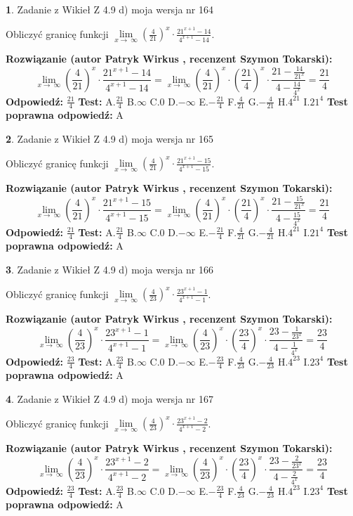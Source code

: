 \documentclass[12pt, a4paper]{article}
\theoremstyle{definition} %
\newtheorem{zad}{}
\newcommand{\zadStart}[1]{\begin{zad}#1\newline}
\newcommand{\zadStop}{\end{zad}}
\newcommand{\rozwStart}[2]{\noindent \textbf{Rozwiązanie (autor #1 , recenzent #2): }\newline}
\newcommand{\rozwStop}{\newline}
\newcommand{\odpStart}{\noindent \textbf{Odpowiedź:}\newline}
\newcommand{\odpStop}{\newline}
\newcommand{\testStart}{\noindent \textbf{Test:}\newline}
\newcommand{\testStop}{\newline}
\newcommand{\kluczStart}{\noindent \textbf{Test poprawna odpowiedź:}\newline}
\newcommand{\kluczStop}{\newline}
\begin{document}
\zadStart{Zadanie z Wikieł Z 4.9 d) moja wersja nr 164}


Obliczyć granicę funkcji  $\lim\limits_{x\to\ \infty}(\frac{4}{21})^{x}\cdot\frac{21^{x+1}-14}{4^{x+1}-14}$.
\zadStop
\rozwStart{Patryk Wirkus}{Szymon Tokarski}
$$\lim\limits_{x\to\ \infty}(\frac{4}{21})^{x}\cdot\frac{21^{x+1}-14}{4^{x+1}-14}=\lim\limits_{x\to\ \infty}(\frac{4}{21})^{x}\cdot(\frac{21}{4})^{x} \cdot \frac{21-\frac{14}{21^{x}}}{4-\frac{14}{4^{x}}} = \frac{21}{4}$$
\rozwStop
\odpStart
$\frac{21}{4}$
\odpStop
\testStart
A.$\frac{21}{4}$ B.$\infty$ C.$0$ D.$-\infty$ E.$-\frac{21}{4}$
F.$\frac{4}{21}$ G.$-\frac{4}{21}$
H.$4^{21}$
I.$21^{4}$
\testStop
\kluczStart
A
\kluczStop



\zadStart{Zadanie z Wikieł Z 4.9 d) moja wersja nr 165}


Obliczyć granicę funkcji  $\lim\limits_{x\to\ \infty}(\frac{4}{21})^{x}\cdot\frac{21^{x+1}-15}{4^{x+1}-15}$.
\zadStop
\rozwStart{Patryk Wirkus}{Szymon Tokarski}
$$\lim\limits_{x\to\ \infty}(\frac{4}{21})^{x}\cdot\frac{21^{x+1}-15}{4^{x+1}-15}=\lim\limits_{x\to\ \infty}(\frac{4}{21})^{x}\cdot(\frac{21}{4})^{x} \cdot \frac{21-\frac{15}{21^{x}}}{4-\frac{15}{4^{x}}} = \frac{21}{4}$$
\rozwStop
\odpStart
$\frac{21}{4}$
\odpStop
\testStart
A.$\frac{21}{4}$ B.$\infty$ C.$0$ D.$-\infty$ E.$-\frac{21}{4}$
F.$\frac{4}{21}$ G.$-\frac{4}{21}$
H.$4^{21}$
I.$21^{4}$
\testStop
\kluczStart
A
\kluczStop



\zadStart{Zadanie z Wikieł Z 4.9 d) moja wersja nr 166}


Obliczyć granicę funkcji  $\lim\limits_{x\to\ \infty}(\frac{4}{23})^{x}\cdot\frac{23^{x+1}-1}{4^{x+1}-1}$.
\zadStop
\rozwStart{Patryk Wirkus}{Szymon Tokarski}
$$\lim\limits_{x\to\ \infty}(\frac{4}{23})^{x}\cdot\frac{23^{x+1}-1}{4^{x+1}-1}=\lim\limits_{x\to\ \infty}(\frac{4}{23})^{x}\cdot(\frac{23}{4})^{x} \cdot \frac{23-\frac{1}{23^{x}}}{4-\frac{1}{4^{x}}} = \frac{23}{4}$$
\rozwStop
\odpStart
$\frac{23}{4}$
\odpStop
\testStart
A.$\frac{23}{4}$ B.$\infty$ C.$0$ D.$-\infty$ E.$-\frac{23}{4}$
F.$\frac{4}{23}$ G.$-\frac{4}{23}$
H.$4^{23}$
I.$23^{4}$
\testStop
\kluczStart
A
\kluczStop



\zadStart{Zadanie z Wikieł Z 4.9 d) moja wersja nr 167}


Obliczyć granicę funkcji  $\lim\limits_{x\to\ \infty}(\frac{4}{23})^{x}\cdot\frac{23^{x+1}-2}{4^{x+1}-2}$.
\zadStop
\rozwStart{Patryk Wirkus}{Szymon Tokarski}
$$\lim\limits_{x\to\ \infty}(\frac{4}{23})^{x}\cdot\frac{23^{x+1}-2}{4^{x+1}-2}=\lim\limits_{x\to\ \infty}(\frac{4}{23})^{x}\cdot(\frac{23}{4})^{x} \cdot \frac{23-\frac{2}{23^{x}}}{4-\frac{2}{4^{x}}} = \frac{23}{4}$$
\rozwStop
\odpStart
$\frac{23}{4}$
\odpStop
\testStart
A.$\frac{23}{4}$ B.$\infty$ C.$0$ D.$-\infty$ E.$-\frac{23}{4}$
F.$\frac{4}{23}$ G.$-\frac{4}{23}$
H.$4^{23}$
I.$23^{4}$
\testStop
\kluczStart
A
\kluczStop
\end{document}
